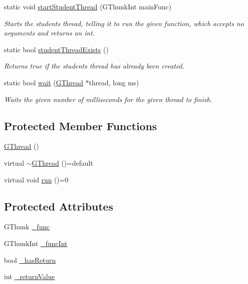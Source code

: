 \begin{DoxyCompactItemize}
static void \mbox{\hyperlink{classGThread_a7d68a5d8a6557bb824cf2568240a1aef}{start\+Student\+Thread}} (G\+Thunk\+Int main\+Func)
\begin{DoxyCompactList}\small\item\em Starts the student\textquotesingle{}s thread, telling it to run the given function, which accepts no arguments and returns an int. \end{DoxyCompactList}\item 
static bool \mbox{\hyperlink{classGThread_af75b92d7df24cf0e2f06193944b9db32}{student\+Thread\+Exists}} ()
\begin{DoxyCompactList}\small\item\em Returns true if the student\textquotesingle{}s thread has already been created. \end{DoxyCompactList}\item 
static bool \mbox{\hyperlink{classGThread_a231df01e3224a1c4a109613a891f554e}{wait}} (\mbox{\hyperlink{classGThread}{G\+Thread}} $\ast$thread, long ms)
\begin{DoxyCompactList}\small\item\em Waits the given number of milliseconds for the given thread to finish. \end{DoxyCompactList}\end{DoxyCompactItemize}
\subsection*{Protected Member Functions}
\begin{DoxyCompactItemize}
\item 
\mbox{\hyperlink{classGThread_a7db4904140090c18f864e09283f2b529}{G\+Thread}} ()
\item 
virtual \mbox{\hyperlink{classGThread_ae4f0a2859df75533269d8916c361855d}{$\sim$\+G\+Thread}} ()=default
\item 
virtual void \mbox{\hyperlink{classGThread_a18954417d3124a8095783ea13dc6d00b}{run}} ()=0
\end{DoxyCompactItemize}
\subsection*{Protected Attributes}
\begin{DoxyCompactItemize}
\item 
G\+Thunk \mbox{\hyperlink{classGThread_a4fb517a41f3dfeb2294ffc6c35ebbcd5}{\+\_\+func}}
\item 
G\+Thunk\+Int \mbox{\hyperlink{classGThread_a78ee15bac1cbfd257b0b430b07275c5d}{\+\_\+func\+Int}}
\item 
bool \mbox{\hyperlink{classGThread_a0e353607decfc12502e16153af0e23d3}{\+\_\+has\+Return}}
\item 
int \mbox{\hyperlink{classGThread_a7efc5c426100905390dc33e2f2b39b17}{\+\_\+return\+Value}}
\end{DoxyCompactItemize}
